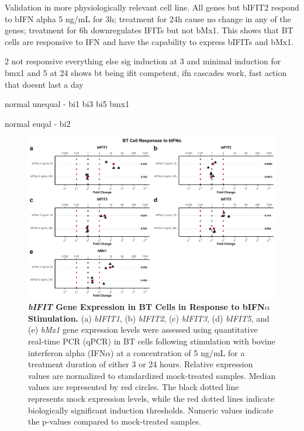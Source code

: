 Validation in more physiologically relevant cell line. All genes but bIFIT2 respond to bIFN alpha 5 ng/mL for 3h; treatment for 24h cause no change in any of the genes; treatment for 6h downregulates IFITs but not bMx1. This shows that BT cells are responsive to IFN and have the capability to express bIFITs and bMx1.

2 not responsive
everything else sig induction at 3 and minimal induction for bmx1 and 5 at 24
shows bt being ifit competent, ifn cascades work, fast action that doesnt last a day


normal unequal - bi1 bi3 bi5 bmx1

normal euqal - bi2 


\begin{figure}
    \centering
    \includegraphics[width=1\linewidth]{07. Chapter 2/Figs/02. Induction/08. bt_bifna.pdf}
    \caption[\textit{bIFIT} Gene Expression in BT Cells in Response to bIFN\(\alpha\) Stimulation.]{\textbf{\textit{bIFIT} Gene Expression in BT Cells in Response to bIFN\(\alpha\) Stimulation.} (a) \textit{bIFIT1}, (b) \textit{bIFIT2}, (c) \textit{bIFIT3}, (d) \textit{bIFIT5}, and (e) \textit{bMx1} gene expression levels were assessed using quantitative real-time PCR (qPCR) in BT cells following stimulation with bovine interferon alpha (IFN\(\alpha\)) at a concentration of 5 ng/mL for a treatment duration of either 3 or 24 hours. Relative expression values are normalized to standardized mock-treated samples. Median values are represented by red circles. The black dotted line represents mock expression levels, while the red dotted lines indicate biologically significant induction thresholds. Numeric values indicate the p-values compared to mock-treated samples.}
    \label{fig:BT responses to bifna}
\end{figure}

